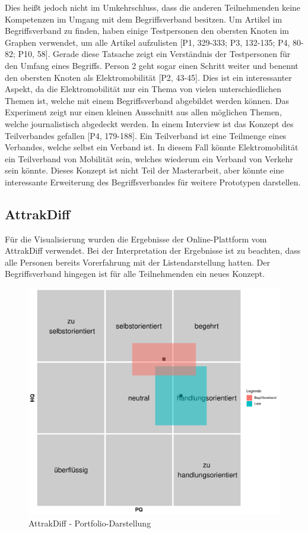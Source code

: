 Dies heißt jedoch nicht im Umkehrschluss, dass die anderen Teilnehmenden keine Kompetenzen im Umgang mit dem Begriffsverband besitzen.
Um Artikel im Begriffsverband zu finden, haben einige Testpersonen den obersten Knoten im Graphen verwendet, um alle Artikel aufzulisten [P1, 329-333; P3, 132-135; P4, 80-82; P10, 58].
Gerade diese Tatsache zeigt ein Verständnis der Testpersonen für den Umfang eines Begriffs.
Person 2 geht sogar einen Schritt weiter und benennt den obersten Knoten als Elektromobilität [P2, 43-45].
Dies ist ein interessanter Aspekt, da die Elektromobilität nur ein Thema von vielen unterschiedlichen Themen ist, welche mit einem Begriffsverband abgebildet werden können.
Das Experiment zeigt nur einen kleinen Ausschnitt aus allen möglichen Themen, welche journalistisch abgedeckt werden.
In einem Interview ist das Konzept des Teilverbandes gefallen [P4, 179-188].
Ein Teilverband ist eine Teilmenge eines Verbandes, welche selbst ein Verband ist.
In diesem Fall könnte Elektromobilität ein Teilverband von Mobilität sein, welches wiederum ein Verband von Verkehr sein könnte.
Dieses Konzept ist nicht Teil der Masterarbeit, aber könnte eine interessante Erweiterung des Begriffsverbandes für weitere Prototypen darstellen.

\subsection{AttrakDiff}\label{subsec:results-attrakdiff}
Für die Visualisierung wurden die Ergebnisse der Online-Plattform vom AttrakDiff verwendet.
Bei der Interpretation der Ergebnisse ist zu beachten, dass alle Personen bereits Vorerfahrung mit der Listendarstellung hatten.
Der Begriffsverband hingegen ist für alle Teilnehmenden ein neues Konzept.

\begin{figure}[!ht]
    \centering
    \includegraphics[width=0.7\columnwidth]{figures/attrakdiff-squares.pdf}
    \caption{\label{fig:attrakdiff-squares}AttrakDiff - Portfolio-Darstellung}
\end{figure}


